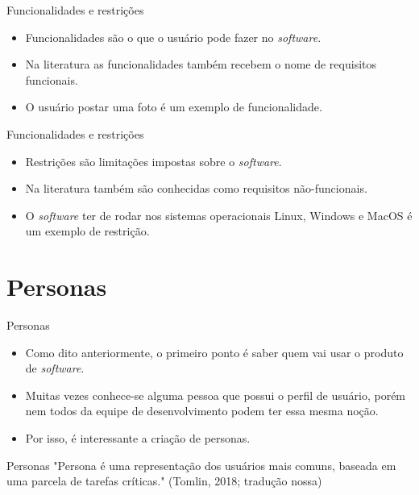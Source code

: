 \documentclass[11pt]{beamer}
\begin{document}
   \begin{frame}{Funcionalidades e restrições}
      \begin{itemize}
         \item Funcionalidades são o que o usuário pode fazer no \textit{software}.
         \item Na literatura as funcionalidades também recebem o nome de requisitos funcionais.
         \item O usuário postar uma foto é um exemplo de funcionalidade.
      \end{itemize}
   \end{frame}

   \begin{frame}{Funcionalidades e restrições}
      \begin{itemize}
         \item Restrições são limitações impostas sobre o \textit{software}.
         \item Na literatura também são conhecidas como requisitos não-funcionais.
         \item O \textit{software} ter de rodar nos sistemas operacionais Linux, Windows e MacOS é um exemplo de restrição.
      \end{itemize}
   \end{frame}

   \section{Personas}

   \begin{frame}{Personas}
      \begin{itemize}
         \item Como dito anteriormente, o primeiro ponto é saber quem vai usar o produto de \textit{software}.
         \item Muitas vezes conhece-se alguma pessoa que possui o perfil de usuário, porém nem todos da equipe de desenvolvimento podem ter essa mesma noção.
         \item Por isso, é interessante a criação de personas.
      \end{itemize}
   \end{frame}

   \begin{frame}{Personas}
      "Persona é uma representação dos usuários mais comuns, baseada em uma parcela de tarefas críticas." (Tomlin, 2018; tradução nossa)
   \end{frame}
\end{document}
